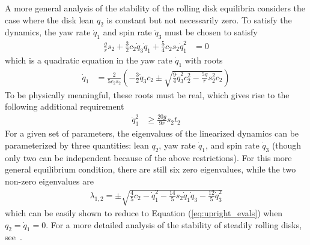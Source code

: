 \documentclass[smallcondensed,final]{svjour3}                     %
\begin{document}
A more general analysis of the stability of the rolling disk equilibria
considers the case where the disk lean $q_2$ is constant but not necessarily
zero. To satisfy the dynamics, the yaw rate $\dot{q}_1$ and spin rate
$\dot{q}_3$ must be chosen to satisfy
\begin{align}
  \frac{g}{r} s_2  + \frac{3}{2}c_2 \dot{q}_3 \dot{q}_1 +
  \frac{5}{4}c_2 s_2 \dot{q}_1^2
 &= 0
\end{align}
which is a quadratic equation in the yaw rate $\dot{q}_1$ with roots
\begin{align}
\dot{q}_1 &= \frac{2}{5 c_2 s_2} \left( - \frac{3}{2} \dot{q}_{3} c_2 \pm
\sqrt{\frac{9}{4} \dot{q}_{3}^{2} c^2_2 - \frac{5 g}{r} s^2_2 c_2} \right)
\end{align}
To be physically meaningful, these roots must be real, which gives rise to the following additional requirement
\begin{align}
  \dot{q}_3^2 &\geq \frac{20g}{9r} s_2 t_2
\end{align}
For a given set of parameters, the eigenvalues of the linearized dynamics can be
parameterized by three quantities: lean $q_2$, yaw rate $\dot{q}_1$, and spin
rate $\dot{q}_3$ (though only two can be independent because of the above
restrictions). For this more general equilibrium condition, there are still six
zero eigenvalues, while the two non-zero eigenvalues are
\begin{align}
\lambda_{1,2} = \pm\sqrt{\frac{4}{5} c_2 - \dot{q}_{1}^{2} -\frac{14}{5} s_2 \dot{q}_{1} \dot{q}_{3} - \frac{12}{5}\dot{q}_{3}^{2}}
\end{align}
which can be easily shown to reduce to Equation (\ref{eq:upright_evals}) when
$q_2 = \dot{q}_1 = 0$. For a more detailed analysis of the stability of
steadily rolling disks, see~\cite{O'Reilly1996,Neimark1972,Kuleshov2001}.
\end{document}
